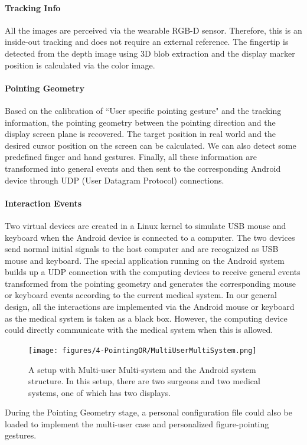 {\paragraph{Tracking Info} 
All the images are perceived via the wearable RGB-D sensor. Therefore, this is an inside-out tracking and does not require an external reference. The fingertip is detected from the depth image using 3D blob extraction and the display marker position is calculated via the color image.
\paragraph{Pointing Geometry}
Based on the calibration of ``User specific pointing gesture" and the tracking information,
the pointing geometry between the pointing direction and the display screen plane is recovered. The target position in real world and the desired cursor position on the screen can be calculated. We can also detect some predefined finger and hand gestures. Finally, all these information are transformed into general events and then sent to the corresponding Android device through UDP (User Datagram Protocol) connections. 
\paragraph{Interaction Events}
Two virtual devices are created in a Linux kernel to simulate USB mouse and keyboard when the Android device is connected to a computer. The two devices send normal initial signals to the host computer and are recognized as USB mouse and keyboard. The special application running on the Android system builds up a UDP connection with the computing devices to receive general events transformed from the pointing geometry and generates the corresponding mouse or keyboard events according to the current medical system. In our general design, all the interactions are implemented via the Android mouse or keyboard as the medical system is taken as a black box. However, the computing device could directly communicate with the medical system when this is allowed. 
\begin{figure} [htb]
	\texttt{[image: figures/4-PointingOR/MultiUserMultiSystem.png]}
	\caption{A setup with Multi-user Multi-system and the Android system structure. In this setup, there are two surgeons and two medical systems, one of which has two displays. }
	\label{fig:4-PointingOR:multiUserMultiSystem}       %
\end{figure}
During the Pointing Geometry stage, a personal configuration file could also be loaded to implement the multi-user case and personalized figure-pointing gestures. 
}
